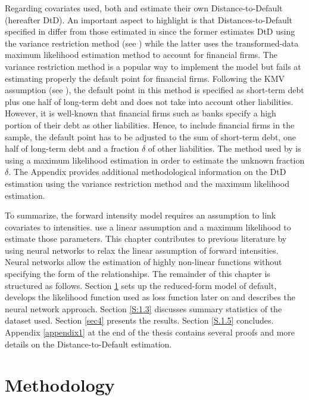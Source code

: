 Regarding covariates used, both \citet{Duan2012} and \citet{DSW} estimate their own Distance-to-Default (hereafter DtD). An important aspect to highlight is that Distances-to-Default specified in \citet{DSW} differ from those estimated in \citet{Duan2012} since the former estimates DtD using the variance restriction method (see \citep{Duan2012DTD}) while the latter uses the transformed-data maximum likelihood estimation method to account for financial firms. The variance restriction method is a popular way to implement the \citet{Merton1974} model but fails at estimating properly the default point for financial firms. Following the KMV assumption (see \citet{KMV}), the default point in this method is specified as short-term debt plus one half of long-term debt and does not take into account other liabilities. However, it is well-known that financial firms such as banks specify a high portion of their debt as other liabilities. Hence, to include financial firms in the sample, the default point has to be adjusted to the sum of short-term debt, one half of long-term debt and a fraction $\delta$ of other liabilities. The method used by \citet{Duan2012} is using a maximum likelihood estimation in order to estimate the unknown fraction $\delta$. The Appendix provides additional methodological information on the DtD estimation using the variance restriction method and the maximum likelihood estimation. 

To summarize, the forward intensity model requires an assumption to link covariates to intensities. \citet{Duan2012} use a linear assumption and a maximum likelihood to estimate those parameters. This chapter contributes to previous literature by using neural networks to relax the linear assumption of forward intensities. Neural networks allow the estimation of highly non-linear functions without specifying the form of the relationships. The remainder of this chapter is structured as follows. Section \ref{S:1.2} sets up the reduced-form model of default, develops the likelihood function used as loss function later on and describes the neural network approach. Section \ref{S:1.3} discusses summary statistics of the dataset used. Section \ref{sec4} presents the results. Section \ref{S.1.5} concludes. Appendix \ref{appendix1} at the end of the thesis contains several proofs and more details on the Distance-to-Default estimation.


\section{Methodology}
\label{S:1.2}

